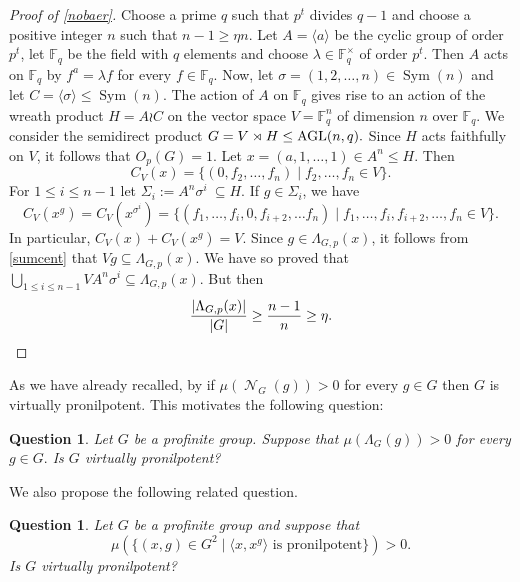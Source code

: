 \documentclass{amsart}
\DeclareMathOperator{\nil}{\mathcal N}
\DeclareMathOperator{\perm}{Sym}
\newcommand{\la}{\langle}
\newcommand{\ra}{\rangle}
\newtheorem{question}[thm]{Question} \newtheorem{con}[thm]{Conjecture}
\numberwithin{equation}{section}
\begin{document}
\begin{proof}[Proof of \cref{nobaer}]
Choose a prime $q$ such that $p^t$ divides $q-1$ and choose a positive integer $n$ such that $n-1\geq\eta n$. Let $A=\la a \ra$ be the cyclic group of order $p^t$,  let $\mathbb F_q$ be the field with $q$ elements and choose $\lambda \in \mathbb F_q^\times$ of order $p^t$. Then $A$ acts on $\mathbb F_q$ by $f^a = \lambda f$ for every $f \in \mathbb F_q$. Now, let $\sigma=(1,2,\dots,n)\in \perm(n)$
and let $C=\langle \sigma \rangle \leq \perm(n).$ The action of $A$ on $\mathbb F_q$ gives rise to an action of the wreath product $H=A\wr C$ on the vector space $V=\mathbb F_q^n$ of dimension $n$ over $\mathbb F_q.$ We consider the semidirect product $G=V\rtimes H \leq {\rm{AGL}}(n,q).$ {Since $H$ acts faithfully on $V$, it follows that $O_p(G)=1$.} Let $x=(a,1,\dots,1)\in A^n\leq H.$
Then $$C_V(x)=\{(0,f_2,\dots,f_n)\mid f_2,\dots,f_n\in V\}.$$
For $1\leq i\leq n-1$
let $\Sigma_i:=A^n\sigma^i\ \subseteq H.$ If $g\in \Sigma_i$, we have
$$C_V(x^g)=C_V(x^{\sigma^i})=\{(f_1,\dots,f_i,0,f_{i+2},\dots f_n)\mid f_1,\dots,f_i,f_{i+2},\dots,f_n\in V\}.$$
In particular, $C_V(x)+C_V(x^{g})=V$. Since $g\in \Lambda_{G,p}(x)$, it follows from \cref{sumcent} that $Vg\subseteq \Lambda_{G,p}(x).$
We have so proved that
$\bigcup_{1\leq i\leq n-1}VA^n\sigma^i \subseteq \Lambda_{G,p}(x).$ 
But then
$$\frac{|\Lambda_{G,p}(x)|}{|G|}\geq\frac{n-1}{n}\geq \eta. \qedhere$$
\end{proof}

As we have already recalled, by \cite[Theorem 1]{aemp} if $\mu(\nil_G(g))>0$ for every $g\in G$ then $G$ is virtually pronilpotent. This motivates the following question:
\begin{question}
	Let $G$ be a profinite group. Suppose that $\mu(\Lambda_{G}(g))>0$ for every  $g\in G.$ Is $G$ virtually pronilpotent?
\end{question}

We also propose the following related question.

\begin{question}
    Let $G$ be a profinite group and suppose that $$\mu(\{(x,g) \in G^2 \mid \la x,x^g\ra \text{ is pronilpotent}\})>0.$$ Is $G$ virtually pronilpotent?
\end{question}
\end{document}
